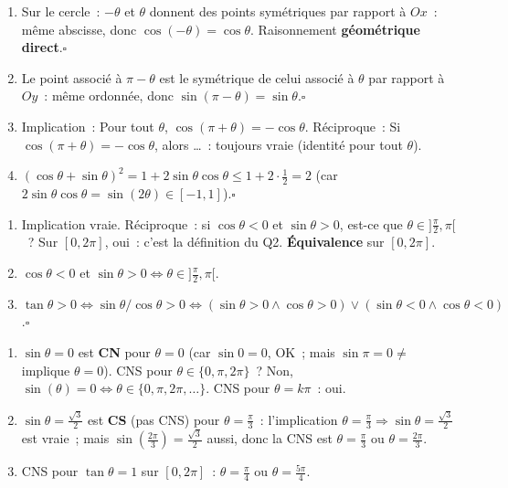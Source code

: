 
\begin{enumerate}
  \item Sur le cercle~: $-\theta$ et $\theta$ donnent des points sym\'etriques par rapport \`a $Ox$~:
        m\^eme abscisse, donc $\cos(-\theta)=\cos\theta$. Raisonnement \textbf{g\'eom\'etrique direct}.\hfill$\square$
  \item Le point associ\'e \`a $\pi-\theta$ est le sym\'etrique de celui associ\'e \`a $\theta$
        par rapport \`a $Oy$~: m\^eme ordonn\'ee, donc $\sin(\pi-\theta)=\sin\theta$.\hfill$\square$
  \item Implication~: \og Pour tout $\theta$, $\cos(\pi+\theta)=-\cos\theta$.\fg
        R\'eciproque~: \og Si $\cos(\pi+\theta)=-\cos\theta$, alors \ldots\fg~: toujours vraie (identit\'e pour tout $\theta$).
  \item $(\cos\theta+\sin\theta)^2=1+2\sin\theta\cos\theta\leq1+2\cdot\frac{1}{2}=2$
        (car $2\sin\theta\cos\theta=\sin(2\theta)\in[-1,1]$).\hfill$\square$
\end{enumerate}


\begin{enumerate}
  \item Implication vraie. R\'eciproque~: si $\cos\theta<0$ et $\sin\theta>0$, est-ce que $\theta\in]\frac{\pi}{2},\pi[$~?
        Sur $[0,2\pi]$, oui~: c'est la d\'efinition du Q2. \textbf{\'Equivalence} sur $[0,2\pi]$.
  \item $\cos\theta<0$ et $\sin\theta>0\Leftrightarrow\theta\in]\frac{\pi}{2},\pi[$.
  \item $\tan\theta>0\Leftrightarrow\sin\theta/\cos\theta>0\Leftrightarrow(\sin\theta>0\wedge\cos\theta>0)\vee(\sin\theta<0\wedge\cos\theta<0)$.\hfill$\square$
\end{enumerate}


\begin{enumerate}
  \item $\sin\theta=0$ est \textbf{CN} pour $\theta=0$ (car $\sin 0=0$, OK~; mais $\sin\pi=0\ne$ implique $\theta=0$).
        CNS pour $\theta\in\{0,\pi,2\pi\}$~? Non, $\sin(\theta)=0\Leftrightarrow\theta\in\{0,\pi,2\pi,\ldots\}$.
        CNS pour $\theta=k\pi$~: oui.
  \item $\sin\theta=\frac{\sqrt{3}}{2}$ est \textbf{CS} (pas CNS) pour $\theta=\frac{\pi}{3}$~:
        l'implication $\theta=\frac{\pi}{3}\Rightarrow\sin\theta=\frac{\sqrt{3}}{2}$ est vraie~;
        mais $\sin(\frac{2\pi}{3})=\frac{\sqrt{3}}{2}$ aussi, donc la CNS est $\theta=\frac{\pi}{3}$ ou $\theta=\frac{2\pi}{3}$.
  \item CNS pour $\tan\theta=1$ sur $[0,2\pi]$~: $\theta=\frac{\pi}{4}$ ou $\theta=\frac{5\pi}{4}$.
\end{enumerate}


